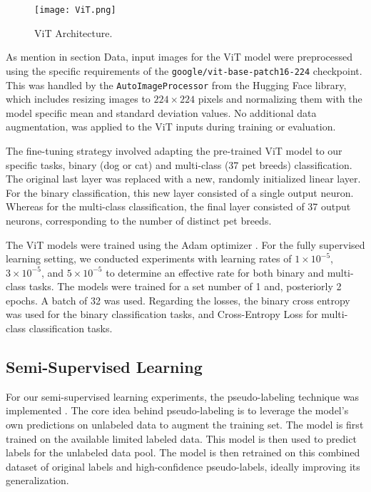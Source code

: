 \documentclass{article}
\begin{document}
\begin{figure}[h]
    \centering
    \texttt{[image: ViT.png]}
    \caption{ViT Architecture.}
    \label{fig:resnet_architecture}
\end{figure}


As mention in section Data, input images for the ViT model were preprocessed using the specific requirements of the \texttt{google/vit-base-patch16-224} checkpoint. This was handled by the \texttt{AutoImageProcessor} from the Hugging Face library, which includes resizing images to $224 \times 224$ pixels and normalizing them with the model specific mean and standard deviation values. No additional data augmentation, was applied to the ViT inputs during training or evaluation.

The fine-tuning strategy involved adapting the pre-trained ViT model to our specific tasks, binary (dog or cat) and multi-class (37 pet breeds) classification. The original last layer was replaced with a new, randomly initialized linear layer. For the binary classification, this new layer consisted of a single output neuron. Whereas for the multi-class classification, the final layer consisted of 37 output neurons, corresponding to the number of distinct pet breeds.

The ViT models were trained using the Adam optimizer \citep{kingma2014adam}. For the fully supervised learning setting, we conducted experiments with learning rates of $1 \times 10^{-5}$, $3 \times 10^{-5}$, and $5 \times 10^{-5}$ to determine an effective rate for both binary and multi-class tasks. The models were trained for a set number of 1 and, posteriorly 2 epochs. A batch of 32 was used. Regarding the losses, the binary cross entropy was used for the binary classification tasks, and Cross-Entropy Loss for multi-class classification tasks. 

\subsection{Semi-Supervised Learning}
For our semi-supervised learning experiments, the pseudo-labeling technique was implemented \cite{lee2013pseudo}. The core idea behind  pseudo-labeling is to leverage the model's own predictions on unlabeled data to augment the training set. The model is first trained on the available limited labeled data. This model is then used to predict labels for the unlabeled data pool. The model is then retrained on this combined dataset of original labels and high-confidence pseudo-labels, ideally improving its generalization. 
\end{document}
